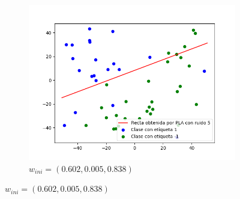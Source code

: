 \documentclass[12pt,a4paper]{article}
\begin{document}
\begin{figure}[H]
\begin{subfigure}{0.33\textwidth}
		\includegraphics[scale=0.37]{./Imagenes/ej2-18.png}
		\caption{$w_{ini} = (0.602,0.005,0.838)$}
	\end{subfigure}
\end{figure}
\end{document}
